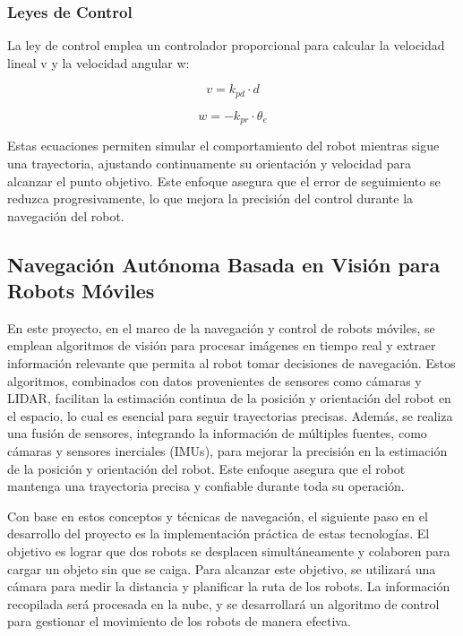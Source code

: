 \documentclass[conference]{IEEEtran}
\begin{document}
\subsubsection{Leyes de Control}

La ley de control emplea un controlador proporcional para calcular la velocidad lineal v y la velocidad angular w:

\begin{equation} v = k_{pd} \cdot d \end{equation}

\begin{equation} w = -k_{pr} \cdot \theta_e \end{equation}

Estas ecuaciones permiten simular el comportamiento del robot mientras sigue una trayectoria, ajustando continuamente su orientación y velocidad para alcanzar el punto objetivo. Este enfoque asegura que el error de seguimiento se reduzca progresivamente, lo que mejora la precisión del control durante la navegación del robot.


\subsection{Navegación Autónoma Basada en Visión para Robots Móviles}

En este proyecto, en el marco de la navegación y control de robots móviles, se emplean algoritmos de visión para procesar imágenes en tiempo real y extraer información relevante que permita al robot tomar decisiones de navegación. Estos algoritmos, combinados con datos provenientes de sensores como cámaras y LIDAR, facilitan la estimación continua de la posición y orientación del robot en el espacio, lo cual es esencial para seguir trayectorias precisas. Además, se realiza una fusión de sensores, integrando la información de múltiples fuentes, como cámaras y sensores inerciales (IMUs), para mejorar la precisión en la estimación de la posición y orientación del robot. Este enfoque asegura que el robot mantenga una trayectoria precisa y confiable durante toda su operación.

Con base en estos conceptos y técnicas de navegación, el siguiente paso en el desarrollo del proyecto es la implementación práctica de estas tecnologías. El objetivo es lograr que dos robots se desplacen simultáneamente y colaboren para cargar un objeto sin que se caiga. Para alcanzar este objetivo, se utilizará una cámara para medir la distancia y planificar la ruta de los robots. La información recopilada será procesada en la nube, y se desarrollará un algoritmo de control para gestionar el movimiento de los robots de manera efectiva.
\end{document}
